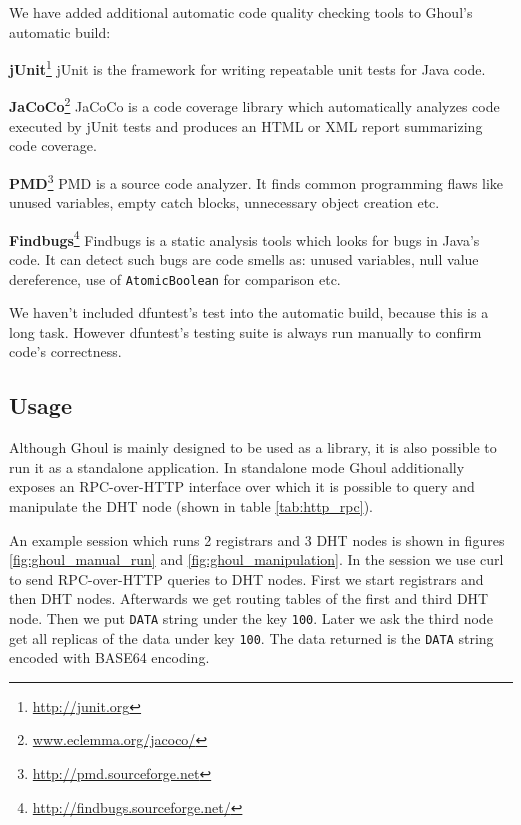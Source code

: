 We have added additional automatic code quality checking tools to Ghoul's automatic build:

\begin{description}
  \item{\textbf{jUnit}\footnote{\url{http://junit.org}}} 
    jUnit is the framework for writing repeatable unit tests for Java code.
  \item{\textbf{JaCoCo}\footnote{\url{www.eclemma.org/jacoco/}}}
    JaCoCo is a code coverage library which automatically analyzes code executed by jUnit tests and produces an HTML or XML report summarizing code coverage.

  \item{\textbf{PMD}\footnote{\url{http://pmd.sourceforge.net}}}
    PMD is a source code analyzer.
    It finds common programming flaws like unused variables, empty catch blocks, unnecessary object creation etc.
  \item{\textbf{Findbugs}\footnote{\url{http://findbugs.sourceforge.net/}}}
    Findbugs is a static analysis tools which looks for bugs in Java's code.
    It can detect such bugs are code smells as: unused variables, null value dereference, use of \texttt{AtomicBoolean} for comparison etc.
    
\end{description}

We haven't included dfuntest's test into the automatic build, because this is a long task.
However dfuntest's testing suite is always run manually to confirm code's correctness.

\subsection{Usage}

Although Ghoul is mainly designed to be used as a library, it is also possible to run it as a standalone application.
In standalone mode Ghoul additionally exposes an RPC-over-HTTP interface over which it is possible to query and manipulate the DHT node (shown in table \ref{tab:http_rpc}).

An example session which runs 2 registrars and 3 DHT nodes is shown in figures 
\ref{fig:ghoul_manual_run} and \ref{fig:ghoul_manipulation}.
In the session we use curl to send RPC-over-HTTP queries to DHT nodes.
First we start registrars and then DHT nodes.
Afterwards we get routing tables of the first and third DHT node.
Then we put \texttt{DATA} string under the key \texttt{100}.
Later we ask the third node get all replicas of the data under key \texttt{100}.
The data returned is the \texttt{DATA} string encoded with BASE64 encoding.

